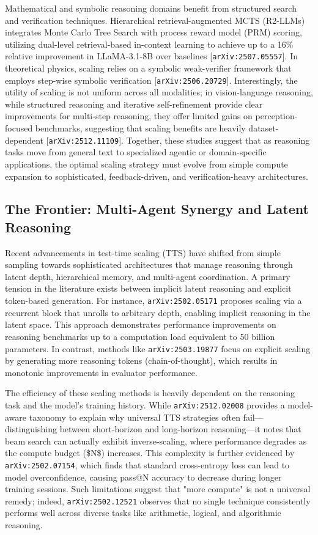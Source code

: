 \documentclass[11pt]{article}
\begin{document}
Mathematical and symbolic reasoning domains benefit from structured search and verification techniques. Hierarchical retrieval-augmented MCTS (R2-LLMs) integrates Monte Carlo Tree Search with process reward model (PRM) scoring, utilizing dual-level retrieval-based in-context learning to achieve up to a 16\% relative improvement in LLaMA-3.1-8B over baselines [\texttt{arXiv:2507.05557}]. In theoretical physics, scaling relies on a symbolic weak-verifier framework that employs step-wise symbolic verification [\texttt{arXiv:2506.20729}]. Interestingly, the utility of scaling is not uniform across all modalities; in vision-language reasoning, while structured reasoning and iterative self-refinement provide clear improvements for multi-step reasoning, they offer limited gains on perception-focused benchmarks, suggesting that scaling benefits are heavily dataset-dependent [\texttt{arXiv:2512.11109}]. Together, these studies suggest that as reasoning tasks move from general text to specialized agentic or domain-specific applications, the optimal scaling strategy must evolve from simple compute expansion to sophisticated, feedback-driven, and verification-heavy architectures.

\subsection{The Frontier: Multi-Agent Synergy and Latent Reasoning}

Recent advancements in test-time scaling (TTS) have shifted from simple sampling towards sophisticated architectures that manage reasoning through latent depth, hierarchical memory, and multi-agent coordination. A primary tension in the literature exists between implicit latent reasoning and explicit token-based generation. For instance, \texttt{arXiv:2502.05171} proposes scaling via a recurrent block that unrolls to arbitrary depth, enabling implicit reasoning in the latent space. This approach demonstrates performance improvements on reasoning benchmarks up to a computation load equivalent to 50 billion parameters. In contrast, methods like \texttt{arXiv:2503.19877} focus on explicit scaling by generating more reasoning tokens (chain-of-thought), which results in monotonic improvements in evaluator performance.

The efficiency of these scaling methods is heavily dependent on the reasoning task and the model's training history. While \texttt{arXiv:2512.02008} provides a model-aware taxonomy to explain why universal TTS strategies often fail—distinguishing between short-horizon and long-horizon reasoning—it notes that beam search can actually exhibit inverse-scaling, where performance degrades as the compute budget (\$N\$) increases. This complexity is further evidenced by \texttt{arXiv:2502.07154}, which finds that standard cross-entropy loss can lead to model overconfidence, causing pass@N accuracy to decrease during longer training sessions. Such limitations suggest that "more compute" is not a universal remedy; indeed, \texttt{arXiv:2502.12521} observes that no single technique consistently performs well across diverse tasks like arithmetic, logical, and algorithmic reasoning.
\end{document}
